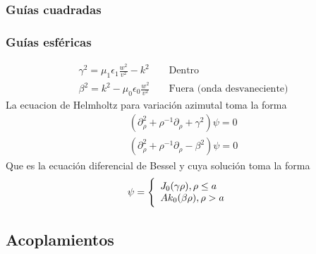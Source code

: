 \subsubsection{Guías cuadradas}
\subsubsection{Guías esféricas}
\begin{subequations}
	\begin{align}
	\gamma^2 =  \mu_{1} \epsilon_{1} \frac{w^2}{v^2} - k^2   && \text{  Dentro}\\
	\beta^2 = k^2 - \mu_{0} \epsilon_{0} \frac{w^2}{v^2}   && \text{ Fuera (onda desvaneciente)}
	\end{align}
\end{subequations}
La ecuacion de Helmholtz para variación azimutal toma la forma
\begin{subequations}
	\begin{align}
	(\partial_{\rho}^2+\rho^{-1} \partial_{\rho}+\gamma^2) \psi = 0\\
	(\partial_{\rho}^2+\rho^{-1} \partial_{\rho}-\beta^2) \psi = 0
	\end{align}
\end{subequations}
Que es la ecuación diferencial de Bessel y cuya solución toma la forma
 \label{Soluciones metalico bessel}
\begin{eqnarray}
\psi   & =  \Bigg\{ 
\begin{array}{ll}
J_{0}(\gamma \rho), \rho \leq a \hfill \\ 
 A k_{0} (\beta \rho), \rho > a 
 \end{array}
\end{eqnarray}


\subsection{Acoplamientos}